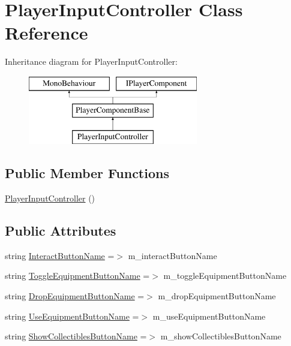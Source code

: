 \hypertarget{class_player_input_controller}{}\section{Player\+Input\+Controller Class Reference}
\label{class_player_input_controller}
Inheritance diagram for Player\+Input\+Controller\+:\begin{figure}[H]
\begin{center}
\leavevmode
\includegraphics[height=3.000000cm]{class_player_input_controller}
\end{center}
\end{figure}
\subsection*{Public Member Functions}
\begin{DoxyCompactItemize}
\item 
\mbox{\hyperlink{class_player_input_controller_a5047ffd4d6676a77673b86f247ded9ec}{Player\+Input\+Controller}} ()
\end{DoxyCompactItemize}
\subsection*{Public Attributes}
\begin{DoxyCompactItemize}
\item 
string \mbox{\hyperlink{class_player_input_controller_a7f9413d100b2de896e691244267a1cae}{Interact\+Button\+Name}} =$>$ m\+\_\+interact\+Button\+Name
\item 
string \mbox{\hyperlink{class_player_input_controller_ab58ef29afafcd892bc1e3b9b24d359cb}{Toggle\+Equipment\+Button\+Name}} =$>$ m\+\_\+toggle\+Equipment\+Button\+Name
\item 
string \mbox{\hyperlink{class_player_input_controller_abc010b188a93dd40f4beb1411ab3fb0d}{Drop\+Equipment\+Button\+Name}} =$>$ m\+\_\+drop\+Equipment\+Button\+Name
\item 
string \mbox{\hyperlink{class_player_input_controller_af5c8b48a99a93ac2c3a2bd0774e0c3b5}{Use\+Equipment\+Button\+Name}} =$>$ m\+\_\+use\+Equipment\+Button\+Name
\item 
string \mbox{\hyperlink{class_player_input_controller_a5824f89af6f76e4e3047252f88fa4dd7}{Show\+Collectibles\+Button\+Name}} =$>$ m\+\_\+show\+Collectibles\+Button\+Name
\end{DoxyCompactItemize}

